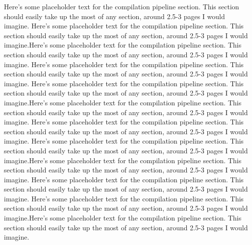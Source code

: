 \documentclass[preprint]{sigplanconf}
\begin{document}
Here's some placeholder text for the compilation pipeline section.  This
section should easily take up the most of any section, around 2.5-3 pages I
would imagine.
Here's some placeholder text for the compilation pipeline section.  This
section should easily take up the most of any section, around 2.5-3 pages I
would imagine.Here's some placeholder text for the compilation pipeline section.
 This
section should easily take up the most of any section, around 2.5-3 pages I
would imagine.
Here's some placeholder text for the compilation pipeline section.  This
section should easily take up the most of any section, around 2.5-3 pages I
would imagine.
Here's some placeholder text for the compilation pipeline section.  This
section should easily take up the most of any section, around 2.5-3 pages I
would imagine.Here's some placeholder text for the compilation pipeline section.
 This
section should easily take up the most of any section, around 2.5-3 pages I
would imagine.
Here's some placeholder text for the compilation pipeline section.  This
section should easily take up the most of any section, around 2.5-3 pages I
would imagine.
Here's some placeholder text for the compilation pipeline section.  This
section should easily take up the most of any section, around 2.5-3 pages I
would imagine.Here's some placeholder text for the compilation pipeline section.
 This
section should easily take up the most of any section, around 2.5-3 pages I
would imagine.
Here's some placeholder text for the compilation pipeline section.  This
section should easily take up the most of any section, around 2.5-3 pages I
would imagine.
Here's some placeholder text for the compilation pipeline section.  This
section should easily take up the most of any section, around 2.5-3 pages I
would imagine.Here's some placeholder text for the compilation pipeline section.
 This
section should easily take up the most of any section, around 2.5-3 pages I
would imagine.
\end{document}
